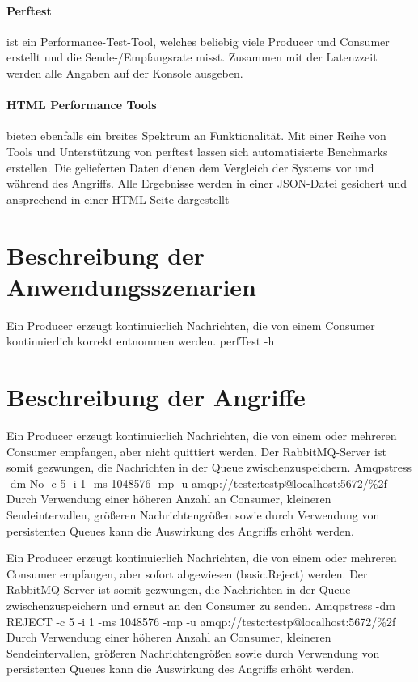 \documentclass[	a4paper,
			11pt,
			titlepage,
			oneside,
			fleqn,
			listof=totoc,
			parskip,
			chapterprefix=false,
			numbers=noenddot]{scrreprt}
\begin{document}
\paragraph{Perftest} ist ein Performance-Test-Tool, welches beliebig viele Producer und Consumer erstellt und die Sende-/Empfangsrate misst. Zusammen mit der Latenzzeit werden alle Angaben auf der Konsole ausgeben.

\paragraph{HTML Performance Tools} bieten ebenfalls ein breites Spektrum an Funktionalität. Mit einer Reihe von Tools und Unterstützung von perftest lassen sich automatisierte Benchmarks erstellen. Die gelieferten Daten dienen dem Vergleich der Systems vor und während des Angriffs. Alle Ergebnisse werden in einer JSON-Datei gesichert und ansprechend in einer HTML-Seite dargestellt

	
	\clearpage
	\section*{Beschreibung der Anwendungsszenarien}
		{Ein Producer erzeugt kontinuierlich Nachrichten, die von einem Consumer kontinuierlich korrekt entnommen werden.}%
		{perfTest -h}%
		{}
		
	\usecase{}%
		{}%
		{}%
		{}
		
	\usecase{}%
		{}%
		{}%
		{}
	
	\clearpage
	\section*{Beschreibung der Angriffe}
		{Ein Producer erzeugt kontinuierlich Nachrichten, die von einem oder mehreren Consumer empfangen, aber nicht quittiert werden.%
		 Der RabbitMQ-Server ist somit gezwungen, die Nachrichten in der Queue zwischenzuspeichern.}%
		{}%
		{Amqpstress -dm No -c 5 -i 1 -ms 1048576 -mp -u amqp://testc:testp@localhost:5672/\%2f}%
		{}%
		{Durch Verwendung einer höheren Anzahl an Consumer, kleineren Sendeintervallen, größeren Nachrichtengrößen sowie durch Verwendung von persistenten %
		Queues kann die Auswirkung des Angriffs erhöht werden.}
	
	
		{Ein Producer erzeugt kontinuierlich Nachrichten, die von einem oder mehreren Consumer empfangen, aber sofort abgewiesen (basic.Reject) werden.%
		 Der RabbitMQ-Server ist somit gezwungen, die Nachrichten in der Queue zwischenzuspeichern und erneut an den Consumer zu senden.}%
		{}%
		{Amqpstress -dm REJECT -c 5 -i 1 -ms 1048576 -mp -u amqp://testc:testp@localhost:5672/\%2f}%
		{}%
		{Durch Verwendung einer höheren Anzahl an Consumer, kleineren Sendeintervallen, größeren Nachrichtengrößen sowie durch Verwendung von persistenten %
		Queues kann die Auswirkung des Angriffs erhöht werden.}
	
\end{document}
